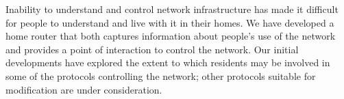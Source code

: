 Inability to understand and control network infrastructure has made it
difficult for people to understand and live with it in their homes.  We have
developed a home router that both captures information about people's use of
the network and provides a point of interaction to control the network.  Our
initial developments have explored the extent to which residents may be
involved in some of the protocols controlling the network; other protocols
suitable for modification are under consideration.

% 
%
%
